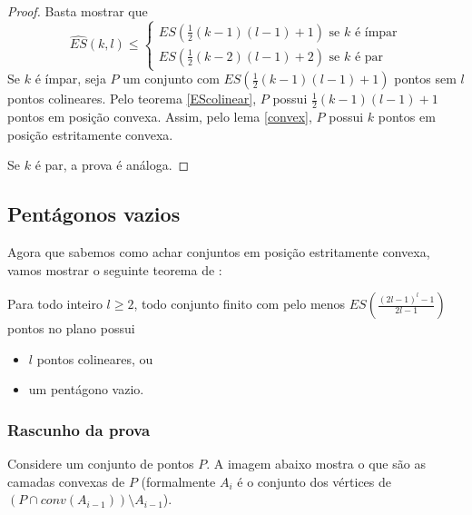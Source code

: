 \begin{proof}
    Basta mostrar que
    $$
    \widehat{ES}(k,l)\leq
    \begin{cases}
        ES(\frac{1}{2}(k-1)(l-1)+1) \text{ se }k\text{ é ímpar}\\
        ES(\frac{1}{2}(k-2)(l-1)+2) \text{ se }k\text{ é par}
    \end{cases}$$
    Se $k$ é ímpar, seja $P$ um conjunto com $ES(\frac{1}{2}(k-1)(l-1)+1)$ pontos sem $l$ pontos colineares. Pelo teorema \ref{EScolinear}, $P$ possui $\frac{1}{2}(k-1)(l-1)+1$ pontos em posição convexa. Assim, pelo lema \ref{convex}, $P$ possui $k$ pontos em posição estritamente convexa.

    Se $k$ é par, a prova é análoga.
\end{proof}

\subsection{Pentágonos vazios}

Agora que sabemos como achar conjuntos em posição estritamente convexa, vamos mostrar o seguinte teorema de \cite{pentagon}:

\begin{teorema}
    Para todo inteiro $l\geq 2$, todo conjunto finito com pelo menos $ES(\frac{(2l-1)^l-1}{2l-1})$ pontos no plano possui 
    \begin{itemize}
        \item $l$ pontos colineares, ou
        \item um pentágono vazio.
    \end{itemize}
\end{teorema}
\subsubsection {Rascunho da prova}
Considere um conjunto de pontos $P$. A imagem abaixo mostra o que são as camadas convexas de $P$ (formalmente $A_i$ é o conjunto dos vértices de $(P\cap conv(A_{i-1})) \setminus A_{i-1}$).


